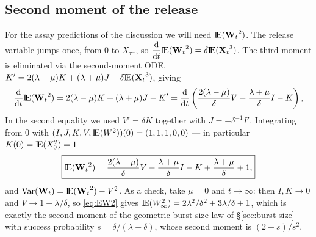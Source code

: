 \subsection{Second moment of the release}
\label{sec:EW2-sec}

For the assay predictions of the discussion we will need ${\rm I}\!{\rm E}({{\bf W}_t}^2)$.
The release variable jumps once, from $0$ to $X_{\tau^-}$, so
$\displaystyle\frac{{\rm d} }{{\rm d} t}{\rm I}\!{\rm E}({{\bf W}_t}^2)=\delta{\rm I}\!{\rm E}({{\bf X}_t}^3)$. The third moment is eliminated via
the second-moment ODE,
$K'=2(\lambda-\mu)K+(\lambda+\mu)J-\delta{\rm I}\!{\rm E}({{\bf X}_t}^3)$, giving
\[
\displaystyle\frac{{\rm d} }{{\rm d} t}{\rm I}\!{\rm E}({{\bf W}_t}^2)=2(\lambda-\mu)K+(\lambda+\mu)J-K'
=\displaystyle\frac{{\rm d} }{{\rm d} t}\left(\frac{2(\lambda-\mu)}{\delta}V-\frac{\lambda+\mu}{\delta}I-K\right),
\]
In the second equality we used $V'=\delta K$ together with
$J=-\delta^{-1}I'$. Integrating from $0$ with
$(I,J,K,V,{\rm I}\!{\rm E}(W^2))(0)=(1,1,1,0,0)$ --- in particular $K(0)={\rm I}\!{\rm E}(X_0^2)=1$ ---
\begin{equation}
\boxed{{\rm I}\!{\rm E}({{\bf W}_t}^2)
=\frac{2(\lambda-\mu)}{\delta}V
-\frac{\lambda+\mu}{\delta}I
-K
+\frac{\lambda+\mu}{\delta}
+1,}
\label{eq:EW2}
\end{equation}
and $\mathrm{Var}({{\bf W}_t})={\rm I}\!{\rm E}({{\bf W}_t}^2)-V^2$. As a check, take $\mu=0$ and
$t\to\infty$: then $I,K\to0$ and $V\to1+\lambda/\delta$, so \eqref{eq:EW2}
gives ${\rm I}\!{\rm E}(W_\infty^2)=2\lambda^2/\delta^2+3\lambda/\delta+1$, which is
exactly the second moment of the geometric burst-size law of
\S\ref{sec:burst-size} with success probability
$s=\delta/(\lambda+\delta)$, whose second moment is $(2-s)/s^2$.
